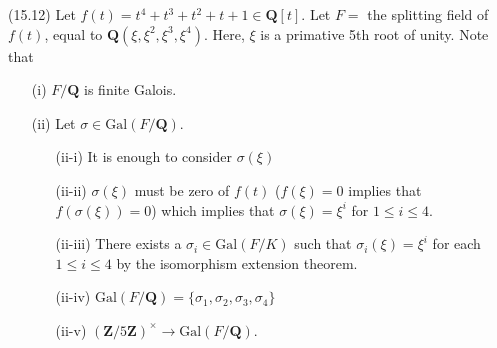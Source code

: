 \begin{ex}
(15.12) Let $f(t)=t^{4}+t^{3}+t^2+t+1\in {\bm Q}[t]$. Let $F=$ the splitting field of $f(t)$, equal to ${\bm Q}(\xi ,\xi ^2,\xi ^3,\xi ^{4})$. Here, $\xi $ is a primative 5th root of unity. Note that
\begin{itemize}
\item[(i)] $F/{\bm Q}$ is finite Galois.
\item[(ii)] Let $\sigma \in \mathrm{Gal}(F/{\bm Q})$. 
\begin{center}

\end{center}
\begin{itemize}
\item[(ii-i)] It is enough to consider $\sigma  (\xi )$ 
\item[(ii-ii)] $\sigma (\xi )$ must be zero of $f(t)$ ($f(\xi )=0$ implies that $f(\sigma (\xi ))=0$) which implies that $\sigma (\xi )=\xi ^{i}$ for $1\leq i \leq 4$. 
\item[(ii-iii)] There exists a $\sigma _{i}\in \mathrm{Gal}(F/K)$ such that $\sigma _{i}(\xi )=\xi ^{i}$ for each $1\leq i\leq 4$ by the isomorphism extension theorem. 
\item[(ii-iv)] $\mathrm{Gal}(F/{\bm Q})=\{\sigma_1,\sigma_2,\sigma_3,\sigma_4\}$
\item[(ii-v)] $({\bm Z}/5{\bm Z})^{\times }\rightarrow \mathrm{Gal}(F/{\bm Q})$.
\end{itemize}
\end{itemize}
\end{ex}
\vspace{2ex}

